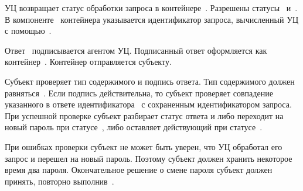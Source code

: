 УЦ возвращает статус обработки запроса в контейнере~. Разрешены
статусы~ и~. В компоненте~
контейнера указывается идентификатор запроса, вычисленный УЦ с
помощью~.

Ответ~ подписывается агентом УЦ. Подписанный ответ оформляется
как контейнер~. Контейнер отправляется субъекту.

Субъект проверяет тип содержимого и подпись ответа. Тип содержимого должен
равняться~. Если подпись действительна, то субъект проверяет
совпадение указанного в ответе идентификатора~ с сохраненным
идентификатором запроса. При успешной проверке субъект разбирает статус ответа и
либо переходит на новый пароль при статусе~, либо оставляет
действующий при статусе~.

При ошибках проверки субъект не может быть уверен, что УЦ обработал его запрос и
перешел на новый пароль. Поэтому субъект должен хранить  некоторое время два
пароля. Окончательное решение о смене пароля субъект должен принять, повторно
выполнив~.
